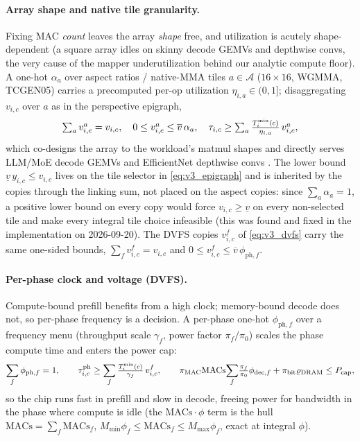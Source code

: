 \paragraph{Array shape and native tile granularity.}
Fixing MAC \emph{count} leaves the array \emph{shape} free, and utilization is
acutely shape-dependent (a square array idles on skinny decode GEMVs and
depthwise convs, the very cause of the mapper underutilization behind our
analytic compute floor). A one-hot $\alpha_a$ over aspect ratios / native-MMA
tiles $a\in\mathcal{A}$ ($16{\times}16$, WGMMA, TCGEN05) carries a precomputed
per-op utilization $\eta_{i,a}\in(0,1]$; disaggregating $v_{i,c}$ over $a$ as in
the perspective epigraph,
\begin{equation}
\textstyle\sum_a v^{a}_{i,c} = v_{i,c},\quad
0 \le v^{a}_{i,c} \le \overline v\,\alpha_a,\quad
\tau_{i,c} \ge \sum_a \tfrac{T^{\min}_i(c)}{\eta_{i,a}}\, v^{a}_{i,c},
\label{eq:v3_arrayshape}
\end{equation}
which co-designs the array to the workload's matmul shapes and directly serves
LLM/MoE decode GEMVs and EfficientNet depthwise convs
\citep{spector2024thunderkittens}. The lower bound $\underline v\,y_{i,c}\le
v_{i,c}$ lives on the tile selector in \eqref{eq:v3_epigraph} and is inherited
by the copies through the linking sum, not placed on the aspect copies: since
$\sum_a\alpha_a=1$, a positive lower bound on every copy would force
$v_{i,c}\ge\underline v$ on every non-selected tile and make every integral tile
choice infeasible (this was found and fixed in the implementation on
2026-09-20). The DVFS copies $v^{f}_{i,c}$ of \eqref{eq:v3_dvfs} carry the same
one-sided bounds, $\sum_f v^{f}_{i,c}=v_{i,c}$ and $0\le v^{f}_{i,c}\le
\overline v\,\phi_{\mathrm{ph},f}$.

\paragraph{Per-phase clock and voltage (DVFS).}
Compute-bound prefill benefits from a high clock; memory-bound decode does not, so
per-phase frequency is a decision. A per-phase one-hot $\phi_{\mathrm{ph},f}$ over
a frequency menu (throughput scale $\gamma_f$, power factor $\pi_f/\pi_0$) scales
the phase compute time and enters the power cap:
\begin{equation}
\sum_f \phi_{\mathrm{ph},f}=1,\qquad
\tau^{\mathrm{ph}}_{i,c} \ge \sum_f \tfrac{T^{\min}_i(c)}{\gamma_f}\,v^{f}_{i,c},\qquad
\pi_{\mathrm{MAC}}\mathrm{MACs}\!\sum_f\!\tfrac{\pi_f}{\pi_0}\phi_{\mathrm{dec},f}
 + \pi_{\mathrm{bit}}\varrho_{\mathrm{DRAM}} \le P_{\mathrm{cap}},
\label{eq:v3_dvfs}
\end{equation}
so the chip runs fast in prefill and slow in decode, freeing power for bandwidth
in the phase where compute is idle (the $\mathrm{MACs}\cdot\phi$ term is the hull
$\mathrm{MACs}=\sum_f \mathrm{MACs}_f$, $M_{\min}\phi_f\le\mathrm{MACs}_f\le
M_{\max}\phi_f$, exact at integral $\phi$).

